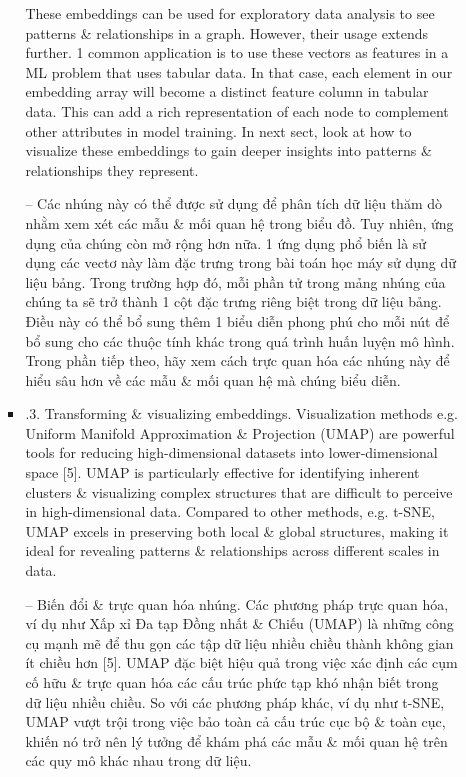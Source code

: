 \documentclass{article}
\begin{document}
\begin{itemize}
\begin{itemize}
\begin{itemize}
           These embeddings can be used for exploratory data analysis to see patterns \& relationships in a graph. However, their usage extends further. 1 common application is to use these vectors as features in a ML problem that uses tabular data. In that case, each element in our embedding array will become a distinct feature column in tabular data. This can add a rich representation of each node to complement other attributes in model training. In next sect, look at how to visualize these embeddings to gain deeper insights into patterns \& relationships they represent.

           -- Các nhúng này có thể được sử dụng để phân tích dữ liệu thăm dò nhằm xem xét các mẫu \& mối quan hệ trong biểu đồ. Tuy nhiên, ứng dụng của chúng còn mở rộng hơn nữa. 1 ứng dụng phổ biến là sử dụng các vectơ này làm đặc trưng trong bài toán học máy sử dụng dữ liệu bảng. Trong trường hợp đó, mỗi phần tử trong mảng nhúng của chúng ta sẽ trở thành 1 cột đặc trưng riêng biệt trong dữ liệu bảng. Điều này có thể bổ sung thêm 1 biểu diễn phong phú cho mỗi nút để bổ sung cho các thuộc tính khác trong quá trình huấn luyện mô hình. Trong phần tiếp theo, hãy xem cách trực quan hóa các nhúng này để hiểu sâu hơn về các mẫu \& mối quan hệ mà chúng biểu diễn.
           \item {.3. Transforming \& visualizing embeddings.} Visualization methods e.g. Uniform Manifold Approximation \& Projection (UMAP) are powerful tools for reducing high-dimensional datasets into lower-dimensional space [5]. UMAP is particularly effective for identifying inherent clusters \& visualizing complex structures that are difficult to perceive in high-dimensional data. Compared to other methods, e.g. t-SNE, UMAP excels in preserving both local \& global structures, making it ideal for revealing patterns \& relationships across different scales in data.

           -- {\sf Biến đổi \& trực quan hóa nhúng.} Các phương pháp trực quan hóa, ví dụ như Xấp xỉ Đa tạp Đồng nhất \& Chiếu (UMAP) là những công cụ mạnh mẽ để thu gọn các tập dữ liệu nhiều chiều thành không gian ít chiều hơn [5]. UMAP đặc biệt hiệu quả trong việc xác định các cụm cố hữu \& trực quan hóa các cấu trúc phức tạp khó nhận biết trong dữ liệu nhiều chiều. So với các phương pháp khác, ví dụ như t-SNE, UMAP vượt trội trong việc bảo toàn cả cấu trúc cục bộ \& toàn cục, khiến nó trở nên lý tưởng để khám phá các mẫu \& mối quan hệ trên các quy mô khác nhau trong dữ liệu.


\end{itemize}
\end{itemize}
\end{itemize}
\end{document}

